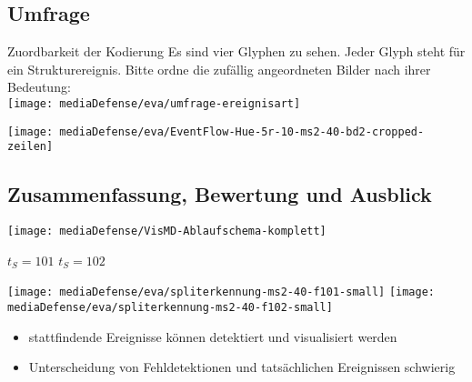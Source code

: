 \documentclass[10pt]{beamer}
\begin{document}
\subsection{Umfrage}
\begin{frame}{Zuordbarkeit der Kodierung}
	Es sind vier Glyphen zu sehen. Jeder Glyph steht für ein Strukturereignis. Bitte ordne die zufällig angeordneten Bilder nach ihrer Bedeutung:\\
	\texttt{[image: mediaDefense/eva/umfrage-ereignisart]}
\end{frame}

%
%
%
\begin{wideframe}
	\texttt{[image: mediaDefense/eva/EventFlow-Hue-5r-10-ms2-40-bd2-cropped-zeilen]}
\end{wideframe}

\subsection{Zusammenfassung, Bewertung und Ausblick}
\begin{wideframe}
	\texttt{[image: mediaDefense/VisMD-Ablaufschema-komplett]}
\end{wideframe}

\begin{wideframe}
	{\scriptsize $t_S=101$}
	\hspace{.41\textwidth}
	{\scriptsize $t_S=102$}
	
	\texttt{[image: mediaDefense/eva/spliterkennung-ms2-40-f101-small]}
	\hspace{.01\textwidth}
	\texttt{[image: mediaDefense/eva/spliterkennung-ms2-40-f102-small]}
	\begin{itemize}[<+->]
		\item stattfindende Ereignisse können detektiert und visualisiert werden
		\item Unterscheidung von Fehldetektionen und tatsächlichen Ereignissen schwierig
	\end{itemize}
\end{wideframe}
\end{document}
